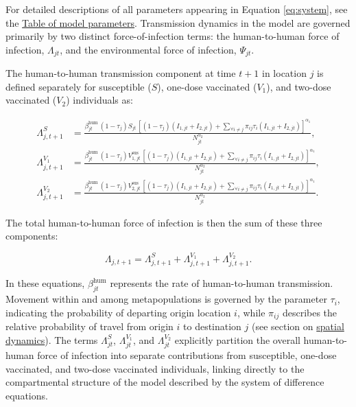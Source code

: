 \documentclass[
]{book}
\begin{document}
For detailed descriptions of all parameters appearing in Equation \eqref{eq:system}, see the \hyperref[parameters-table]{Table of model parameters}. Transmission dynamics in the model are governed primarily by two distinct force-of-infection terms: the human-to-human force of infection, \(\Lambda_{jt}\), and the environmental force of infection, \(\Psi_{jt}\).

The human-to-human transmission component at time \(t+1\) in location \(j\) is defined separately for susceptible (\(S\)), one-dose vaccinated (\(V_1\)), and two-dose vaccinated (\(V_2\)) individuals as:

\begin{equation}
\begin{aligned}
\Lambda^S_{j,t+1} &= \frac{
\beta_{jt}^{\text{hum}} \, (1-\tau_{j})S_{jt} \, \left[ (1-\tau_{j}) (I_{1,jt} + I_{2,jt}) + \sum_{\forall i \neq j} \pi_{ij}\tau_i(I_{1,jt} + I_{2,jt}) \right]^{\alpha_1}}{N_{jt}^{\alpha_2}},\\[5mm]
\Lambda^{V_1}_{j,t+1} &= \frac{
\beta_{jt}^{\text{hum}} \, (1-\tau_{j})V^{\text{sus}}_{1,jt}  \, \left[ (1-\tau_{j})(I_{1,jt} + I_{2,jt}) + \sum_{\forall i \neq j} \pi_{ij}\tau_i(I_{1,jt} + I_{2,jt}) \right]^{\alpha_1}}{N_{jt}^{\alpha_2}},\\[5mm]
\Lambda^{V_2}_{j,t+1} &= \frac{
\beta_{jt}^{\text{hum}} \, (1-\tau_{j})V^{\text{sus}}_{2,jt} \, \left[ (1-\tau_{j})(I_{1,jt} + I_{2,jt}) + \sum_{\forall i \neq j} \pi_{ij}\tau_i(I_{1,jt} + I_{2,jt}) \right]^{\alpha_1}}{N_{jt}^{\alpha_2}}.
\end{aligned}
\label{eq:foi-human}
\end{equation}

The total human-to-human force of infection is then the sum of these three components:

\begin{equation}
\Lambda_{j,t+1} =  \Lambda^S_{j,t+1} + \Lambda^{V_1}_{j,t+1} + \Lambda^{V_2}_{j,t+1}.
\label{eq:foi-human-total}
\end{equation}

In these equations, \(\beta_{jt}^{\text{hum}}\) represents the rate of human-to-human transmission. Movement within and among metapopulations is governed by the parameter \(\tau_i\), indicating the probability of departing origin location \(i\), while \(\pi_{ij}\) describes the relative probability of travel from origin \(i\) to destination \(j\) (see section on \hyperref[spatial-dynamics]{spatial dynamics}). The terms \(\Lambda^{S}_{jt}\), \(\Lambda^{V_1}_{jt}\), and \(\Lambda^{V_2}_{jt}\) explicitly partition the overall human-to-human force of infection into separate contributions from susceptible, one-dose vaccinated, and two-dose vaccinated individuals, linking directly to the compartmental structure of the model described by the system of difference equations.
\end{document}
